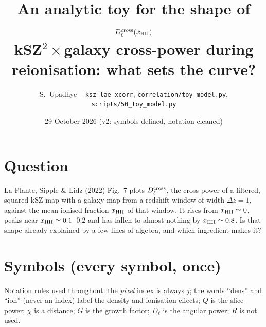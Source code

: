 \documentclass[10pt,a4paper]{article}
\title{An analytic toy for the shape of $D_\ell^{\rm cross}(x_{\rm HII})$\\\large kSZ$^2\times$galaxy cross-power during reionisation: what sets the curve?}
\author{S.\ Upadhye \;--\; \texttt{ksz-lae-xcorr}, \texttt{correlation/toy\_model.py}, \texttt{scripts/50\_toy\_model.py}}
\date{29 October 2026 (v2: symbols defined, notation cleaned)}
\begin{document}
\maketitle

\section{Question}
La Plante, Sipple \& Lidz (2022) Fig.~7 plots $D_\ell^{\rm cross}$, the cross-power of a filtered, squared kSZ map with a galaxy map from a redshift window of width $\Delta z=1$, against the mean ionised fraction $x_{\rm HII}$ of that window. It rises from $x_{\rm HII}\simeq0$, peaks near $x_{\rm HII}\simeq 0.1$--$0.2$ and has fallen to almost nothing by $x_{\rm HII}\simeq0.8$. Is that shape already explained by a few lines of algebra, and which ingredient makes it?

\section{Symbols (every symbol, once)}
Notation rules used throughout: the \emph{pixel} index is always $j$; the words ``dens'' and ``ion'' (never an index) label the density and ionisation effects; $Q$ is the slice power; $\chi$ is a distance; $G$ is the growth factor; $D_\ell$ is the angular power; $R$ is not used.
\end{document}
